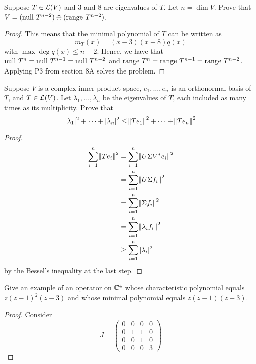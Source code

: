 \documentclass{extarticle}
\begin{document}
\begin{problem}{5}
    Suppose \(T \in \mathcal{L}(V)\) and 3 and 8 are eigenvalues of \(T\). Let \(n = \dim V\). Prove that 
    \(V = (\text{null } T^{n-2}) \oplus (\text{range } T^{n-2})\). 
\end{problem}


\begin{proof}
This means that the minimal polynomial of \(T\) can be written as 
\[m_T(x) = (x-3)(x-8)q(x)\]
with \(\max \deg q(x) \leq n-2\). Hence, we have that \(\text{null } T^{n} = \text{null } T^{n-1} = \text{null } T^{n-2}\) and 
\(\text{range } T^{n} = \text{range } T^{n-1} = \text{range } T^{n-2}\). Applying P3 from section 8A solves the problem. 
\end{proof}

\begin{problem}{10}
    Suppose \(V\) is a complex inner product space, \(e_1, \ldots, e_n\) is an orthonormal basis of \(T\), 
    and \(T \in \mathcal{L}(V)\). Let \(\lambda_1, \ldots, \lambda_n\) be the eigenvalues of \(T\), each included 
    as many times as its multiplicity. Prove that 
    \[|\lambda_1|^2 + \cdots + |\lambda_n|^2 \leq \norm{T e_1}^2 + \cdots + \norm{T e_n}^2\]
\end{problem}

\begin{proof}
\begin{align*}
    \sum_{i=1}^{n}\norm{T e_i}^2 
    &= \sum_{i=1}^{n}\norm{U \Sigma V^* e_i}^2  \\ 
    &= \sum_{i=1}^{n}\norm{U \Sigma f_i}^2 \\ 
    &= \sum_{i=1}^{n}\norm{\Sigma f_i}^2 \\  
    &= \sum_{i=1}^{n} \norm{\lambda_i f_i}^2 \\ 
    &\geq \sum_{i=1}^{n} |\lambda_i|^2
\end{align*}
by the Bessel's inequality at the last step. 
\end{proof}

\begin{problem}{14}
    Give an example of an operator on \(\mathbb{C}^4\) whose characteristic polynomial equals 
    \(z(z-1)^2 (z-3)\) and whose minimal polynomial equals \(z(z - 1) (z-3)\).
\end{problem}

\begin{proof}
Consider 
\[
J = \begin{pmatrix}
0 & 0 & 0 & 0 \\
0 & 1 & 1 & 0 \\
0 & 0 & 1 & 0 \\
0 & 0 & 0 & 3
\end{pmatrix}
\]
\end{proof}
\end{document}
